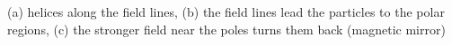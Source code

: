 (a) helices along the field lines, (b) the field lines lead the particles to the polar regions, (c) the stronger field near the poles turns them back (magnetic mirror)
